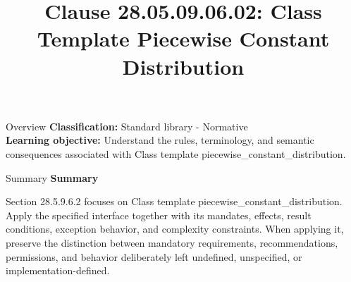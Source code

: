 \documentclass[10pt,letterpaper]{article}
\title{Clause 28.05.09.06.02: Class Template Piecewise Constant Distribution}
\author{}
\date{}
\begin{document}
\maketitle
\begin{CornellOverviewBox}{Overview}
\textbf{Classification:} Standard library - Normative\\[2pt]
\textbf{Learning objective:} Understand the rules, terminology, and semantic consequences associated with Class template piecewise\_constant\_distribution.
\end{CornellOverviewBox}\begin{CornellSummaryBox}{Summary}
{\sffamily\bfseries\color{Accent} Summary}\par\vspace{3pt}Section 28.5.9.6.2 focuses on Class template piecewise\_constant\_distribution. Apply the specified interface together with its mandates, effects, result conditions, exception behavior, and complexity constraints. When applying it, preserve the distinction between mandatory requirements, recommendations, permissions, and behavior deliberately left undefined, unspecified, or implementation-defined.
\end{CornellSummaryBox}
\end{document}
